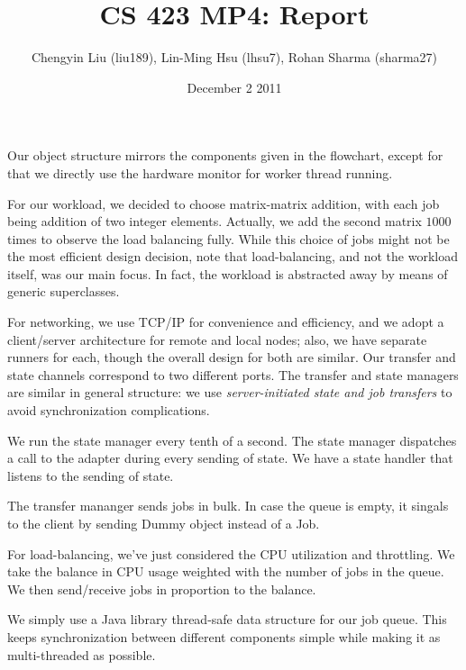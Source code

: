 \documentclass[12pt]{article}
\begin{document}
\title{CS 423 MP4: Report} %
\author{Chengyin Liu (liu189), Lin-Ming Hsu (lhsu7), Rohan Sharma (sharma27)}  %
\date{December 2 2011}  %
\maketitle

Our object structure mirrors the components given in the flowchart, except for that we directly use the hardware monitor for worker thread running. 

For our workload, we decided to choose matrix-matrix addition, with each job being addition of two integer elements. Actually, we add the second matrix $1000$ times to observe the load balancing fully. While this choice of jobs might not be the most efficient design decision, note that load-balancing, and not the workload itself, was our main focus. In fact, the workload is abstracted away by means of generic superclasses. 

For networking, we use TCP/IP for convenience and efficiency, and we adopt a client/server architecture for remote and local nodes; also, we have separate runners for each, though the overall design for both are similar. Our transfer and state channels correspond to two different ports. The transfer and state managers are similar in general structure: we use \textit{server-initiated state and job transfers} to avoid synchronization complications.

We run the state manager every tenth of a second. The state manager dispatches a call to the adapter during every sending of state. We have a state handler that listens to the sending of state.

The transfer mananger sends jobs in bulk. In case the queue is empty, it singals to the client by sending Dummy object instead of a Job.

For load-balancing, we've just considered the CPU utilization and throttling. We take the balance in CPU usage weighted with the number of jobs in the queue. We then send/receive jobs in proportion to the balance.

We simply use a Java library thread-safe data structure for our job queue. This keeps synchronization between different components simple while making it as multi-threaded as possible.
\end{document}
